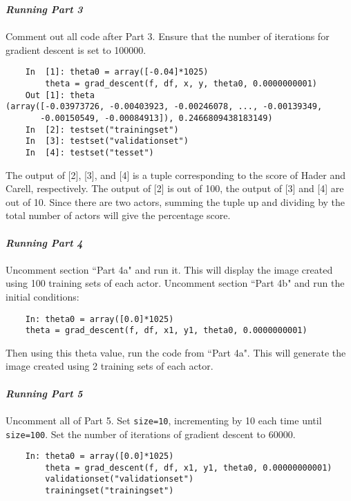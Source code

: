 \documentclass{article}
\begin{document}
\noindent \textit{\textbf{Running Part 3}}
\\
\\
Comment out all code after Part 3. Ensure that the number of iterations for gradient descent is set to 100000.
\begin{verbatim}
    In  [1]: theta0 = array([-0.04]*1025)
        theta = grad_descent(f, df, x, y, theta0, 0.0000000001)
    Out [1]: theta
(array([-0.03973726, -0.00403923, -0.00246078, ..., -0.00139349,
       -0.00150549, -0.00084913]), 0.2466809438183149)
    In  [2]: testset("trainingset")
    In  [3]: testset("validationset")
    In  [4]: testset("tesset")
\end{verbatim}
The output of [2], [3], and [4] is a tuple corresponding to the score of Hader and Carell, respectively. The output of [2] is out of 100, the output of [3] and [4] are out of 10. Since there are two actors, summing the tuple up and dividing by the total number of actors will give the percentage score. 
\\
\\
\noindent \textit{\textbf{Running Part 4}}
\\
\\
Uncomment section ``Part 4a" and run it. This will display the image created using 100 training sets of each actor. Uncomment section ``Part 4b" and run the initial conditions:
\begin{verbatim}
    In: theta0 = array([0.0]*1025)
    theta = grad_descent(f, df, x1, y1, theta0, 0.0000000001)
\end{verbatim}
Then using this theta value, run the code from ``Part 4a". This will generate the image created using 2 training sets of each actor.
\\
\\
\noindent \textit{\textbf{Running Part 5}}
\\
\\
Uncomment all of Part 5. Set \verb|size=10|, incrementing by 10 each time until \verb|size=100|. Set the number of iterations of gradient descent to 60000.
\begin{verbatim}
    In: theta0 = array([0.0]*1025)
        theta = grad_descent(f, df, x1, y1, theta0, 0.00000000001)
        validationset("validationset")
        trainingset("trainingset")
\end{verbatim}
\end{document}
